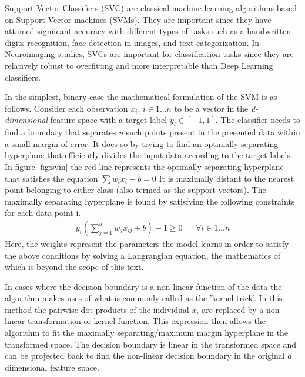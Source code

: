 \documentclass[msthesis.tex]{subfiles}
\begin{document}
Support Vector Classifiers (SVC) are classical machine learning algorithms based on Support Vector machines (SVMs). They are important since they have attained signifcant accuracy with different types of tasks such as a handwritten digits recognition, face detection in images, and text categorization\cite{burges1998a}. In Neuroimaging studies, SVCs are important for classification tasks since they are relatively robust to overfitting and more interpretable than Deep Learning classifiers.

In the simplest, binary case the mathematical formulation of the SVM is as follows. Consider each observation \textbf{$x_i$}, $i\in {1...n}$ to be a vector in the \textit{d-dimensional} feature space with a target label  $y_i\in {[-1,1]}$. The classifier needs to find a boundary that separates \textit{n} such points present in the presented data within a small margin of error.  It does so by trying to find an optimally separating hyperplane that efficiently divides the input data according to the target labels. In figure \ref{fig:svm} the red line represents the optimally separating hyperplane that satisfies the equation
$ \sum w_i x_i - b = 0$
 It is maximally distant to the nearest point belonging to either class (also termed as the support vectors). The maximally separating hyperplane is found by satisfying the following constraints for each data point i. 
\begin{align}
    y_i(\sum_{j=1}^{d} w_{j} x_{ij}  + b)  - 1\geq 0 && \forall i \in {1...n}
\end{align}
Here, the weights represent the parameters the model learns in order to satisfy the above conditions by solving a Langrangian equation, the mathematics of which is beyond the scope of this text.  

In cases where the decision boundary is a non-linear function of the data the algorithm makes uses of what is commonly called as the 'kernel trick'. In this method the pairwise dot products of the individual $x_i$ are replaced by a non-linear transformation or kernel function. This expression then allows the algorithm to fit the maximally separating/maximum margin hyperplane in the transformed space. The decision boundary is linear in the transformed space and can be projected back to find the non-linear decision boundary in the original $d$ dimensional feature space. 
\end{document}

